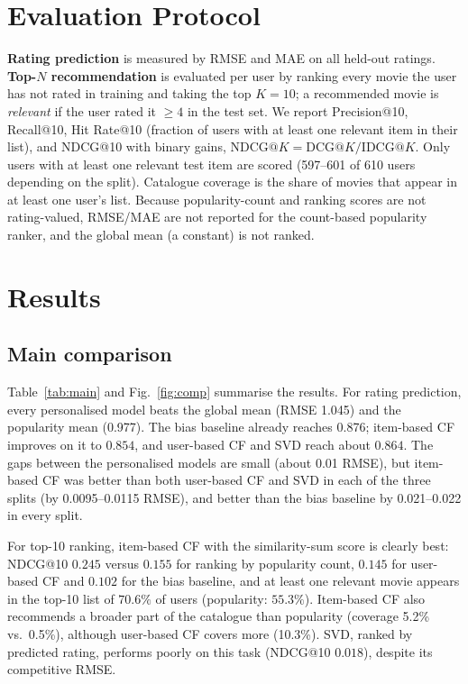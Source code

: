 \documentclass[conference]{IEEEtran}
\begin{document}
\section{Evaluation Protocol}
\textbf{Rating prediction} is measured by RMSE and MAE on all held-out ratings. \textbf{Top-$N$ recommendation} is evaluated per user by ranking every movie the user has not rated in training and taking the top $K=10$; a recommended movie is \emph{relevant} if the user rated it $\ge 4$ in the test set. We report Precision@10, Recall@10, Hit Rate@10 (fraction of users with at least one relevant item in their list), and NDCG@10 with binary gains, $\mathrm{NDCG@}K=\mathrm{DCG@}K/\mathrm{IDCG@}K$. Only users with at least one relevant test item are scored (597--601 of 610 users depending on the split). Catalogue coverage is the share of movies that appear in at least one user's list. Because popularity-count and ranking scores are not rating-valued, RMSE/MAE are not reported for the count-based popularity ranker, and the global mean (a constant) is not ranked.

\section{Results}
\subsection{Main comparison}
Table~\ref{tab:main} and Fig.~\ref{fig:comp} summarise the results. For rating prediction, every personalised model beats the global mean (RMSE 1.045) and the popularity mean (0.977). The bias baseline already reaches 0.876; item-based CF improves on it to $0.854$, and user-based CF and SVD reach about $0.864$. The gaps between the personalised models are small (about 0.01 RMSE), but item-based CF was better than both user-based CF and SVD in each of the three splits (by 0.0095--0.0115 RMSE), and better than the bias baseline by 0.021--0.022 in every split.

For top-10 ranking, item-based CF with the similarity-sum score is clearly best: NDCG@10 $0.245$ versus $0.155$ for ranking by popularity count, $0.145$ for user-based CF and $0.102$ for the bias baseline, and at least one relevant movie appears in the top-10 list of $70.6\%$ of users (popularity: $55.3\%$). Item-based CF also recommends a broader part of the catalogue than popularity (coverage 5.2\% vs.\ 0.5\%), although user-based CF covers more (10.3\%). SVD, ranked by predicted rating, performs poorly on this task (NDCG@10 $0.018$), despite its competitive RMSE.
\end{document}
